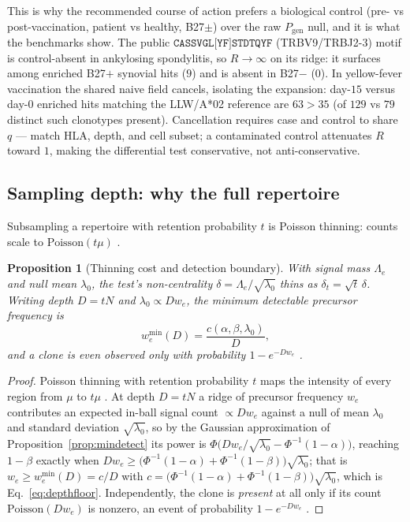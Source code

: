 \documentclass[11pt]{article}
\theoremstyle{oldplain}
\newtheorem{proposition}{Proposition}
\theoremstyle{oldrem}
\newcommand{\Pgen}{P_{\mathrm{gen}}}
\begin{document}
This is why the recommended course of action prefers a biological control (pre- vs post-vaccination, patient
vs healthy, {\scshape B27}$\pm$) over the raw $\Pgen$ null, and it is what the benchmarks show. The public
$\texttt{CASSVGL[YF]STDTQYF}$ (TRBV9/TRBJ2-3) motif is control-absent in ankylosing spondylitis, so
$R\to\infty$ on its ridge: it surfaces among enriched {\scshape B27}$+$ synovial hits ($9$) and is absent in
{\scshape B27}$-$ ($0$). In yellow-fever vaccination the shared naive field cancels, isolating the expansion:
day-$15$ versus day-$0$ enriched hits matching the {\scshape LLW}/A*02 reference are $63>35$ (of $129$ vs
$79$ distinct such clonotypes present). Cancellation requires case and control to share $q$ --- match {\scshape
HLA}, depth, and cell subset; a contaminated control attenuates $R$ toward $1$, making the differential test
conservative, not anti-conservative.

\subsection{Sampling depth: why the full repertoire}\label{sec:dens-depth}

Subsampling a repertoire with retention probability $t$ is Poisson thinning: counts scale to
$\mathrm{Poisson}(t\mu)$ \cite{Kingman1993}.

\begin{proposition}[Thinning cost and detection boundary]\label{prop:depth}
With signal mass $\Lambda_e$ and null mean $\lambda_0$, the test's non-centrality
$\delta=\Lambda_e/\sqrt{\lambda_0}$ thins as $\delta_t=\sqrt{t}\,\delta$. Writing depth $D=tN$ and
$\lambda_0\propto Dw_e$, the minimum detectable precursor frequency is
\begin{equation}\label{eq:depthfloor}
  w_e^{\min}(D)=\frac{c(\alpha,\beta,\lambda_0)}{D},
\end{equation}
and a clone is even \emph{observed} only with probability $1-e^{-Dw_e}$ \cite{Good1953}.
\end{proposition}
\begin{proof}
Poisson thinning with retention probability $t$ maps the intensity of every region from $\mu$ to $t\mu$
\cite{Kingman1993}. At depth $D=tN$ a ridge of precursor frequency $w_e$ contributes an expected in-ball
signal count $\propto Dw_e$ against a null of mean $\lambda_0$ and standard deviation $\sqrt{\lambda_0}$, so
by the Gaussian approximation of Proposition~\ref{prop:mindetect} its power is
$\Phi\!\big(Dw_e/\sqrt{\lambda_0}-\Phi^{-1}(1-\alpha)\big)$, reaching $1-\beta$ exactly when
$Dw_e\ge\big(\Phi^{-1}(1-\alpha)+\Phi^{-1}(1-\beta)\big)\sqrt{\lambda_0}$; that is
$w_e\ge w_e^{\min}(D)=c/D$ with $c=\big(\Phi^{-1}(1-\alpha)+\Phi^{-1}(1-\beta)\big)\sqrt{\lambda_0}$, which is
Eq.~\eqref{eq:depthfloor}. Independently, the clone is \emph{present} at all only if its count
$\mathrm{Poisson}(Dw_e)$ is nonzero, an event of probability $1-e^{-Dw_e}$ \cite{Good1953}.
\end{proof}
\end{document}
